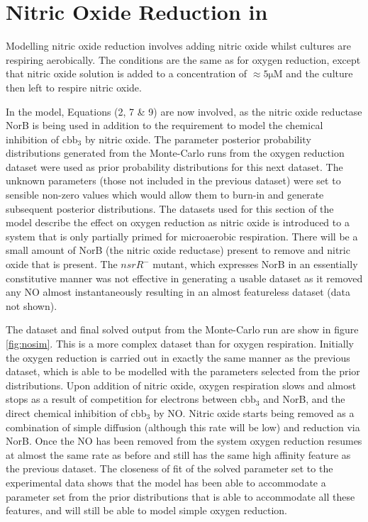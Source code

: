 \chapter{Nitric Oxide Reduction in \Nm{}}

Modelling nitric oxide reduction involves adding nitric oxide whilst cultures are respiring aerobically. The conditions are the same as for oxygen reduction, except that nitric oxide solution is added to a concentration of $\mathrm{\approx 5\mu M}$ and the culture then left to respire nitric oxide.

In the model, Equations (2, 7 \& 9) are now involved, as the nitric oxide reductase NorB is being used in addition to the requirement to model the chemical inhibition of $\mathrm{cbb}_3$ by nitric oxide. The parameter posterior probability distributions generated from the Monte-Carlo runs from the oxygen reduction dataset were used as prior probability distributions for this next dataset. The unknown parameters (those not included in the previous dataset) were set to sensible non-zero values which would allow them to burn-in and generate subsequent posterior distributions.
The datasets used for this section of the model describe the effect on oxygen reduction as nitric oxide is introduced to a system that is only partially primed for microaerobic respiration. There will be a small amount of NorB (the nitric oxide reductase) present to remove and nitric oxide that is present. The $\mathit{nsrR}^-$ mutant, which expresses NorB in an essentially constitutive manner was not effective in generating a usable dataset as it removed any NO almost instantaneously resulting in an almost featureless dataset (data not shown).

The dataset and final solved output from the Monte-Carlo run are show in figure \ref{fig:nosim}. This is a more complex dataset than for oxygen respiration. Initially the oxygen reduction is carried out in exactly the same manner as the previous dataset, which is able to be modelled with the parameters selected from the prior distributions. Upon addition of nitric oxide, oxygen respiration slows and almost stops as a result of competition for electrons between $\mathrm{cbb}_3$ and NorB, and the direct chemical inhibition of $\mathrm{cbb}_3$ by NO. Nitric oxide starts being removed as a combination of simple diffusion (although this rate will be low) and reduction via NorB. Once the NO has been removed from the system oxygen reduction resumes at almost the same rate as before and still has the same high affinity feature as the previous dataset. The closeness of fit of the solved parameter set to the experimental data shows that the model has been able to accommodate a parameter set from the prior distributions that is able to accommodate all these features, and will still be able to model simple oxygen reduction.

